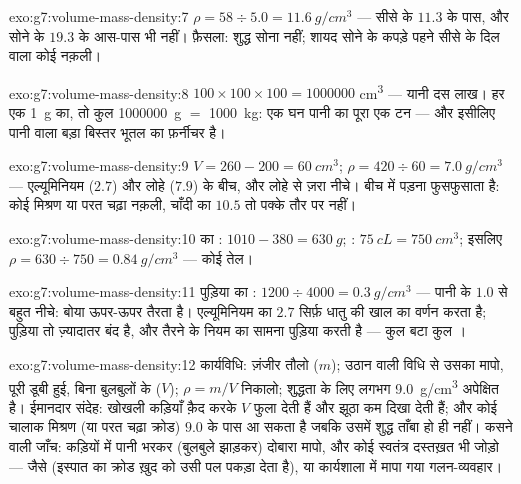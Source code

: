 \begin{solution}{exo:g7:volume-mass-density:7}
$\rho = 58 \div 5.0 = \qty{11.6}{g/cm^3}$ --- सीसे के $11.3$ के
पास, और सोने के $19.3$ के आस-पास भी नहीं। फ़ैसला: शुद्ध सोना नहीं;
शायद सोने के कपड़े पहने सीसे के दिल वाला कोई नक़ली।
\end{solution}

\begin{solution}{exo:g7:volume-mass-density:8}
$100 \times 100 \times 100 = 1000000$ \unit{cm^3} --- यानी दस लाख।
हर एक \qty{1}{g} का, तो कुल \qty{1000000}{g} $=$ \qty{1000}{kg}:
एक घन  पानी का पूरा एक टन --- और इसीलिए पानी वाला बड़ा बिस्तर
भूतल का फ़र्नीचर है।
\end{solution}

\begin{solution}{exo:g7:volume-mass-density:9}
$V = 260 - 200 = \qty{60}{cm^3}$;
$\rho = 420 \div 60 = \qty{7.0}{g/cm^3}$ --- एल्यूमिनियम ($2.7$)
और लोहे ($7.9$) के बीच, और लोहे से ज़रा नीचे। बीच में पड़ना
फुसफुसाता है: कोई मिश्रण या परत चढ़ा नक़ली, चाँदी का $10.5$ तो पक्के
तौर पर नहीं।
\end{solution}

\begin{solution}{exo:g7:volume-mass-density:10}
 का : $1010 - 380 = \qty{630}{g}$; :
$\qty{75}{cL} = \qty{750}{cm^3}$; इसलिए $\rho = 630 \div 750 =
\qty{0.84}{g/cm^3}$ --- कोई तेल।
\end{solution}

\begin{solution}{exo:g7:volume-mass-density:11}
पुड़िया का : $1200 \div 4000 = \qty{0.3}{g/cm^3}$ --- पानी के
$1.0$ से बहुत नीचे: बोया ऊपर-ऊपर तैरता है। एल्यूमिनियम का $2.7$
सिर्फ़ धातु की खाल का वर्णन करता है; पुड़िया तो ज़्यादातर बंद  है,
और तैरने के नियम का सामना पुड़िया करती है --- कुल  बटा कुल
।
\end{solution}

\begin{solution}{exo:g7:volume-mass-density:12}
कार्यविधि: ज़ंजीर तौलो ($m$); उठान वाली विधि से उसका  मापो, पूरी
डूबी हुई, बिना बुलबुलों के ($V$); $\rho = m/V$ निकालो; शुद्धता के
लिए लगभग \qty{9.0}{g/cm^3} अपेक्षित है। ईमानदार संदेह: खोखली कड़ियाँ
 क़ैद करके $V$ फुला देती हैं और  झूठा कम दिखा देती हैं; और
कोई चालाक मिश्रण (या परत चढ़ा क्रोड) $9.0$ के पास आ सकता है जबकि उसमें
शुद्ध ताँबा हो ही नहीं। कसने वाली जाँच: कड़ियों में पानी भरकर (बुलबुले
झाड़कर)  दोबारा मापो, और कोई स्वतंत्र दस्तख़त भी जोड़ो --- जैसे
 (इस्पात का क्रोड ख़ुद को उसी पल पकड़ा देता है), या कार्यशाला में
मापा गया गलन-व्यवहार।
\end{solution}

